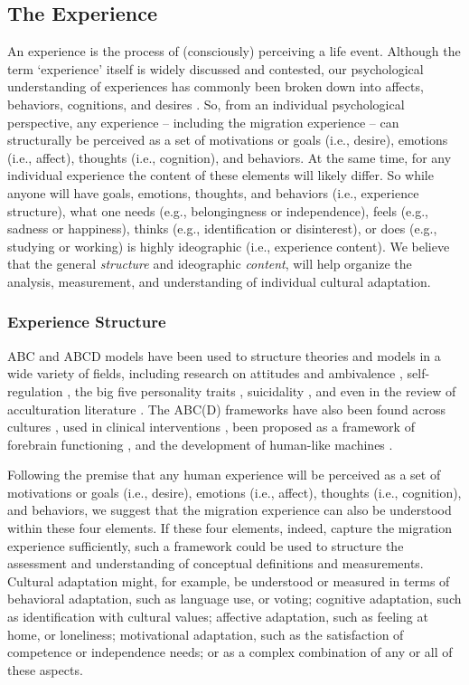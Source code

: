 \documentclass[man, 12pt, a4paper]{apa7}
\begin{document}
\subsection{The Experience}
An experience is the process of (consciously) perceiving a life event. Although the term `experience' itself is widely discussed and contested, our psychological understanding of experiences has commonly been broken down into affects, behaviors, cognitions, and desires \citep[e.g.,][sometimes referred to as the ABCs or ABCDs of psychology]{Cottam2010, Hogg2005, Jhangiani2014}. So, from an individual psychological perspective, any experience -- including the migration experience -- can structurally be perceived as a set of motivations or goals (i.e., desire), emotions (i.e., affect), thoughts (i.e., cognition), and behaviors. At the same time, for any individual experience the content of these elements will likely differ. So while anyone will have goals, emotions, thoughts, and behaviors (i.e., experience structure), what one needs (e.g., belongingness or independence), feels (e.g., sadness or happiness), thinks (e.g., identification or disinterest), or does (e.g., studying or working) is highly ideographic (i.e., experience content). We believe that the general \textit{structure} and ideographic \textit{content}, will help organize the analysis, measurement, and understanding of individual cultural adaptation.

\subsubsection{Experience Structure}
ABC and ABCD models have been used to structure theories and models in a wide variety of fields, including research on attitudes \citep{Breckler1984} and ambivalence \citep{VanHarreveld2015}, self-regulation \citep{Ben-Eliyahu2015}, the big five personality traits \citep{Wilt2016}, suicidality \citep{Harris2015}, and even in the review of acculturation literature \citep{Ward2001, Ward2019}. The ABC(D) frameworks have also been found across cultures \citep[e.g.,][]{Bhawuk2011}, used in clinical interventions \citep{Eifert1989}, been proposed as a framework of forebrain functioning \citep{Swanson2020}, and the development of human-like machines \citep{Guo2020}.

Following the premise that any human experience will be perceived as a set of motivations or goals (i.e., desire), emotions (i.e., affect), thoughts (i.e., cognition), and behaviors, we suggest that the migration experience can also be understood within these four elements. If these four elements, indeed, capture the migration experience sufficiently, such a framework could be used to structure the assessment and understanding of conceptual definitions and measurements. Cultural adaptation might, for example, be understood or measured in terms of behavioral adaptation, such as language use, or voting; cognitive adaptation, such as identification with cultural values; affective adaptation, such as feeling at home, or loneliness; motivational adaptation, such as the satisfaction of competence or independence needs; or as a complex combination of any or all of these aspects. 
\end{document}
